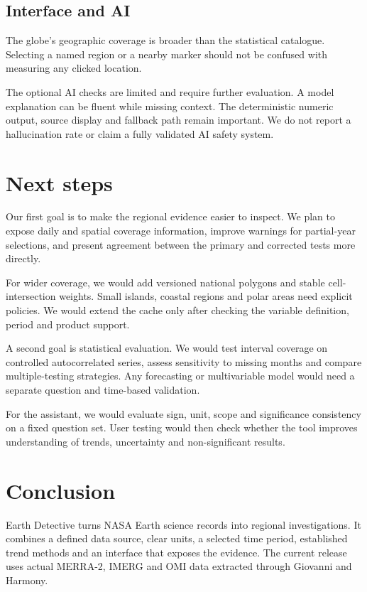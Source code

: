 \documentclass[10pt,a4paper,twocolumn]{article}
\begin{document}
\subsection{Interface and AI}
The globe's geographic coverage is broader than the statistical catalogue. Selecting a named region or a nearby marker should not be confused with measuring any clicked location.

The optional AI checks are limited and require further evaluation. A model explanation can be fluent while missing context. The deterministic numeric output, source display and fallback path remain important. We do not report a hallucination rate or claim a fully validated AI safety system.

\section{Next steps}
Our first goal is to make the regional evidence easier to inspect. We plan to expose daily and spatial coverage information, improve warnings for partial-year selections, and present agreement between the primary and corrected tests more directly.

For wider coverage, we would add versioned national polygons and stable cell-intersection weights. Small islands, coastal regions and polar areas need explicit policies. We would extend the cache only after checking the variable definition, period and product support.

A second goal is statistical evaluation. We would test interval coverage on controlled autocorrelated series, assess sensitivity to missing months and compare multiple-testing strategies. Any forecasting or multivariable model would need a separate question and time-based validation.

For the assistant, we would evaluate sign, unit, scope and significance consistency on a fixed question set. User testing would then check whether the tool improves understanding of trends, uncertainty and non-significant results.

\section{Conclusion}
Earth Detective turns NASA Earth science records into regional investigations. It combines a defined data source, clear units, a selected time period, established trend methods and an interface that exposes the evidence. The current release uses actual MERRA-2, IMERG and OMI data extracted through Giovanni and Harmony.
\end{document}
